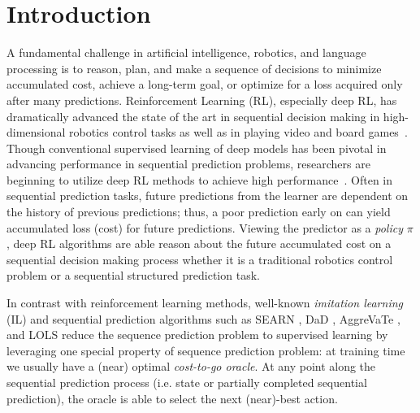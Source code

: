 \documentclass{article}
\begin{document}



\section{Introduction}
A fundamental challenge in artificial intelligence, robotics, and language processing is to reason, plan, and make a sequence of decisions to minimize accumulated cost, achieve a long-term goal, or optimize for a loss acquired only after many predictions. Reinforcement Learning (RL), especially deep RL, has dramatically advanced the state of the art in sequential decision making in high-dimensional robotics control tasks as well as in playing video and board games~\cite{schulman2015trust,silver2016mastering}. Though conventional supervised learning of deep models has been pivotal in advancing performance in sequential prediction problems, researchers are beginning to utilize deep RL methods to achieve high performance~\cite{ranzato2015sequence,bahdanau2016actor,li2016deep}. Often in sequential prediction tasks, future predictions from the learner are dependent on the history of previous predictions; thus, a poor prediction early on can yield accumulated loss (cost) for future predictions. Viewing the predictor as a \emph{policy} $\pi$, deep RL algorithms are able reason about the future accumulated cost on a sequential decision making process whether it is a traditional robotics control problem or a sequential structured prediction task.

In contrast with reinforcement learning methods, well-known \emph{imitation learning} (IL) and sequential prediction algorithms such as SEARN \cite{daume2009search}, DaD \cite{venkatraman2015improving}, AggreVaTe \cite{ross2014reinforcement}, and LOLS \cite{chang2015learning} reduce the sequence prediction problem to supervised learning by leveraging one special property of sequence prediction problem: at training time we usually have a (near) optimal \emph{cost-to-go oracle}. At any point along the sequential prediction process (i.e. state or partially completed sequential prediction), the oracle is able to select the next (near)-best action. 
\end{document}
